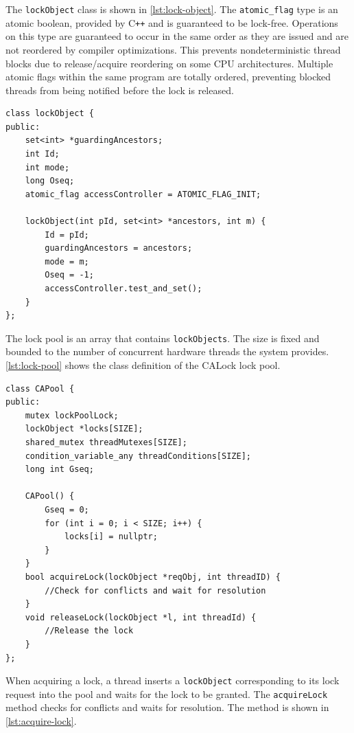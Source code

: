The \texttt{lockObject} class is shown in \cref{lst:lock-object}. The \texttt{atomic\_flag} type is an atomic boolean, provided by C\texttt{++} and is guaranteed to be lock-free. Operations on this type are guaranteed to occur in the same order as they are issued and are not reordered by compiler optimizations. This prevents nondeterministic thread blocks due to release/acquire reordering on some CPU architectures. Multiple atomic flags within the same program are totally ordered, preventing blocked threads from being notified before the lock is released.

\begin{lstlisting}[caption={\texttt{lockObject} class}, label={lst:lock-object}]
class lockObject {
public:
    set<int> *guardingAncestors;
    int Id;
    int mode;
    long Oseq;
    atomic_flag accessController = ATOMIC_FLAG_INIT;

    lockObject(int pId, set<int> *ancestors, int m) {
        Id = pId;
        guardingAncestors = ancestors;
        mode = m;
        Oseq = -1;
        accessController.test_and_set();
    }
};
\end{lstlisting}

The lock pool is an array that contains \texttt{lockObjects}. The size is fixed and bounded to the number of concurrent hardware threads the system provides. \cref{lst:lock-pool} shows the class definition of the CALock lock pool.

\begin{lstlisting}[caption={\texttt{lockPool} class}, label={lst:lock-pool}]
class CAPool {
public:
    mutex lockPoolLock;
    lockObject *locks[SIZE];
    shared_mutex threadMutexes[SIZE];
    condition_variable_any threadConditions[SIZE];
    long int Gseq;

    CAPool() {
        Gseq = 0;
        for (int i = 0; i < SIZE; i++) {
            locks[i] = nullptr;
        }
    }
    bool acquireLock(lockObject *reqObj, int threadID) {
        //Check for conflicts and wait for resolution
    }
    void releaseLock(lockObject *l, int threadId) {
        //Release the lock
    }
};
\end{lstlisting}


When acquiring a lock, a thread inserts a \texttt{lockObject} corresponding to its lock request into the pool and waits for the lock to be granted. The \texttt{acquireLock} method checks for conflicts and waits for resolution. The method is shown in  \cref{lst:acquire-lock}.

